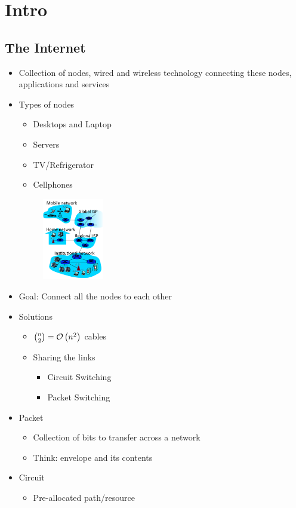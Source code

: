 \section{Intro}
\subsection{The Internet}
\begin{itemize}[nosep]
    \item Collection of nodes, wired and wireless technology connecting these nodes, applications and services
    \item Types of nodes
          \begin{itemize}[nosep]
              \item Desktops and Laptop
              \item Servers
              \item TV/Refrigerator
              \item Cellphones
          \end{itemize}
          \begin{figure}[H]
              \includegraphics[width=0.25\textwidth]{lazy/internet.png}
          \end{figure}
    \item Goal: Connect all the nodes to each other
    \item Solutions
          \begin{itemize}[nosep]
              \item $\binom{n}{2} = \mathcal{O}\left(n^2\right)$ cables
              \item Sharing the links
                    \begin{itemize}[nosep]
                        \item Circuit Switching
                        \item Packet Switching
                    \end{itemize}
          \end{itemize}
    \item Packet
          \begin{itemize}[nosep]
              \item Collection of bits to transfer across a network
              \item Think: envelope and its contents
          \end{itemize}
    \item Circuit
          \begin{itemize}[nosep]
              \item Pre-allocated path/resource
          \end{itemize}
\end{itemize}
